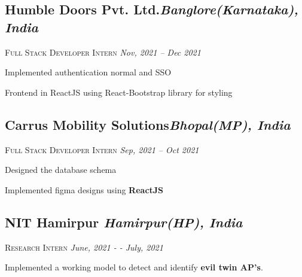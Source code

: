 \documentclass[11pt]{article}
\begin{document}
\subsection*{Humble Doors Pvt. Ltd.\hfill \normalsize \normalfont \textit{Banglore(Karnataka), India}}
\vspace{-1ex}
\textsc{\textmd{Full Stack Developer Intern}} \hfill \normalsize \textit{Nov, 2021 -- Dec 2021}
\vspace{-1ex}

\begin{description}
\setlength{\itemindent}{2\parindent}
\setlength{\itemsep}{0em}
\item[$\bullet$]{Implemented authentication normal and SSO}
\item[$\bullet$]{Frontend in ReactJS using React-Bootstrap library for styling}
\end{description}

\subsection*{Carrus Mobility Solutions\hfill \normalsize \normalfont \textit{Bhopal(MP), India}}
\vspace{-1ex}
\textsc{\textmd{Full Stack Developer Intern}} \hfill \normalsize \textit{Sep, 2021 -- Oct 2021}
\vspace{-1ex}

\begin{description}
\setlength{\itemindent}{2\parindent}
\setlength{\itemsep}{0em}
\item[$\bullet$]{Designed the database schema}
\item[$\bullet$]{Implemented figma designs using \textbf{ReactJS}}
\end{description}

\subsection*{NIT Hamirpur \hfill \normalsize \normalfont \textit{Hamirpur(HP), India}}
\vspace{-1ex}
\textsc{\textmd{Research Intern}} \hfill \normalsize \textit{June, 2021 - - July, 2021}
\vspace{-1ex}

\begin{description}
\setlength{\itemindent}{2\parindent}
\setlength{\itemsep}{0em}
\item[$\bullet$]{Implemented a working model to detect and identify \textbf{evil twin AP's}.}
\end{description}
\end{document}
